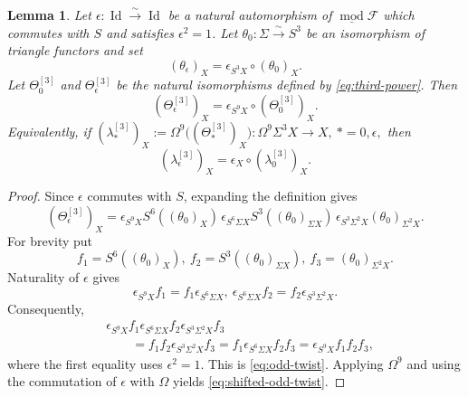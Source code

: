 \documentclass[10pt,a4paper]{amsart}
\newtheorem{lemma}{Lemma}
\begin{document}
\begin{lemma}\label{lem:odd-twist}
Let $\epsilon:\operatorname{Id}\xrightarrow{\sim}\operatorname{Id}$ be a natural automorphism of $\underline{\operatorname{mod}}\mathcal F$ which commutes with $S$ and satisfies $\epsilon^2=1$. Let $\theta_0:\Sigma\xrightarrow{\sim}S^3$ be an isomorphism of triangle functors and set
\[
(\theta_\epsilon)_X=\epsilon_{S^3X}\circ(\theta_0)_X.
\]
Let $\Theta_0^{[3]}$ and $\Theta_\epsilon^{[3]}$ be the natural isomorphisms defined by \eqref{eq:third-power}. Then
\begin{equation}\label{eq:odd-twist}
(\Theta_\epsilon^{[3]})_X
=\epsilon_{S^9X}\circ(\Theta_0^{[3]})_X.
\end{equation}
Equivalently, if
$
(\lambda_*^{[3]})_X
:=\Omega^9\bigl((\Theta_*^{[3]})_X\bigr):
\Omega^9\Sigma^3X\longrightarrow X,
~ *=0,\epsilon,
$
then
\begin{equation}\label{eq:shifted-odd-twist}
(\lambda_\epsilon^{[3]})_X
=\epsilon_X\circ(\lambda_0^{[3]})_X.
\end{equation}
\end{lemma}

\begin{proof}
Since $\epsilon$ commutes with $S$, expanding the definition gives
\[
(\Theta_\epsilon^{[3]})_X
=\epsilon_{S^9X}S^6((\theta_0)_X)\,
\epsilon_{S^6\Sigma X}S^3((\theta_0)_{\Sigma X})\,
\epsilon_{S^3\Sigma^2X}(\theta_0)_{\Sigma^2X}.
\]
For brevity put
\[
f_1=S^6((\theta_0)_X),~
f_2=S^3((\theta_0)_{\Sigma X}),~
f_3=(\theta_0)_{\Sigma^2X}.
\]
Naturality of $\epsilon$ gives
\[
\epsilon_{S^9X}f_1=f_1\epsilon_{S^6\Sigma X},
~
\epsilon_{S^6\Sigma X}f_2=f_2\epsilon_{S^3\Sigma^2X}.
\]
Consequently,
\[
\begin{aligned}
&\epsilon_{S^9X}f_1\epsilon_{S^6\Sigma X}f_2
\epsilon_{S^3\Sigma^2X}f_3\\
&\qquad =f_1f_2\epsilon_{S^3\Sigma^2X}f_3
=f_1\epsilon_{S^6\Sigma X}f_2f_3
=\epsilon_{S^9X}f_1f_2f_3,
\end{aligned}
\]
where the first equality uses $\epsilon^2=1$. This is \eqref{eq:odd-twist}. Applying $\Omega^9$ and using the commutation of $\epsilon$ with $\Omega$ yields \eqref{eq:shifted-odd-twist}.
\end{proof}
\end{document}
